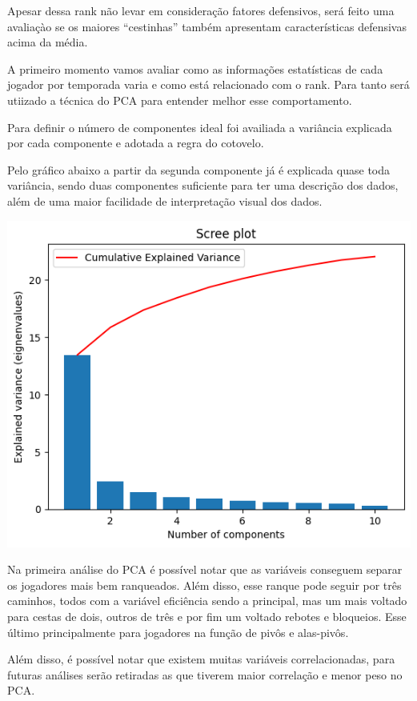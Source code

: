 \documentclass[
]{book}
\begin{document}
Apesar dessa rank não levar em consideração fatores defensivos, será feito uma avaliaçào se os maiores ``cestinhas'' também apresentam características defensivas acima da média.

A primeiro momento vamos avaliar como as informações estatísticas de cada jogador por temporada varia e como está relacionado com o rank. Para tanto será utiizado a técnica do PCA para entender melhor esse comportamento.

Para definir o número de componentes ideal foi availiada a variância explicada por cada componente e adotada a regra do cotovelo.

Pelo gráfico abaixo a partir da segunda componente já é explicada quase toda variância, sendo duas componentes suficiente para ter uma descrição dos dados, além de uma maior facilidade de interpretação visual dos dados.

\includegraphics{imagens/3.png}

Na primeira análise do PCA é possível notar que as variáveis conseguem separar os jogadores mais bem ranqueados. Além disso, esse ranque pode seguir por três caminhos, todos com a variável eficiência sendo a principal, mas um mais voltado para cestas de dois, outros de três e por fim um voltado rebotes e bloqueios. Esse último principalmente para jogadores na função de pivôs e alas-pivôs.

Além disso, é possível notar que existem muitas variáveis correlacionadas, para futuras análises serão retiradas as que tiverem maior correlação e menor peso no PCA.
\end{document}
